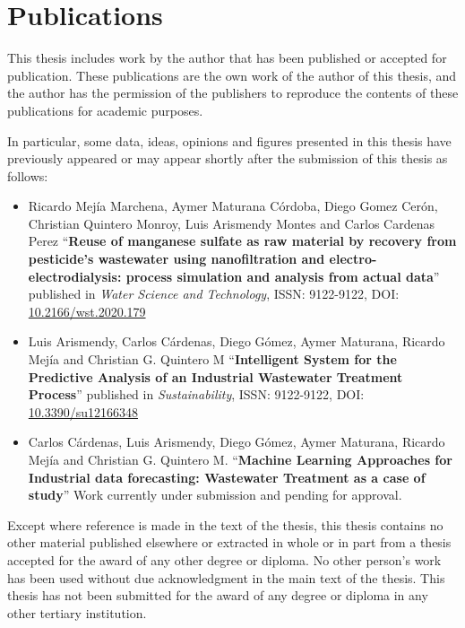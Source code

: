 \chapter*{Publications}

This thesis includes work by the author that has been published or accepted for publication. These publications are the own work of the author of this thesis, and the author has the permission of the publishers to reproduce the contents of these publications for academic purposes.

In particular, some data, ideas, opinions and figures presented in this thesis have previously appeared or may appear shortly after the submission of this thesis as follows:
\begin{itemize}


\item Ricardo Mejía Marchena, Aymer Maturana Córdoba, Diego Gomez Cerón, Christian Quintero Monroy, Luis Arismendy Montes and Carlos Cardenas Perez ``\textbf{Reuse of manganese sulfate as raw material by recovery from pesticide's wastewater using nanofiltration and electro-electrodialysis: process simulation and analysis from actual data}'' published in \emph{Water Science and Technology}, ISSN: 9122-9122, DOI: \href{https://iwaponline.com/wst/article/82/2/315/73680/Reuse-of-manganese-sulfate-as-raw-material-by}{10.2166/wst.2020.179}
  
\item Luis Arismendy, Carlos Cárdenas, Diego Gómez, Aymer Maturana, Ricardo Mejía and Christian G. Quintero M ``\textbf{Intelligent System for the Predictive Analysis of an Industrial Wastewater Treatment Process}'' published in \emph{Sustainability}, ISSN: 9122-9122, DOI: \href{https://www.mdpi.com/2071-1050/12/16/6348}{10.3390/su12166348}
  
\item Carlos Cárdenas, Luis Arismendy, Diego Gómez, Aymer Maturana, Ricardo Mejía and Christian G. Quintero M. ``\textbf{Machine Learning Approaches for Industrial data forecasting: Wastewater Treatment as a case of study}'' \textendash{} Work currently under submission and pending for approval. 
  
\end{itemize}
Except where reference is made in the text of the thesis, this thesis contains no other material published elsewhere or extracted in whole or in part from a thesis accepted for the award of any other degree or diploma. No other person's work has been used without due acknowledgment in the main text of the thesis. This thesis has not been submitted for the award of any degree or diploma in any other tertiary institution.


